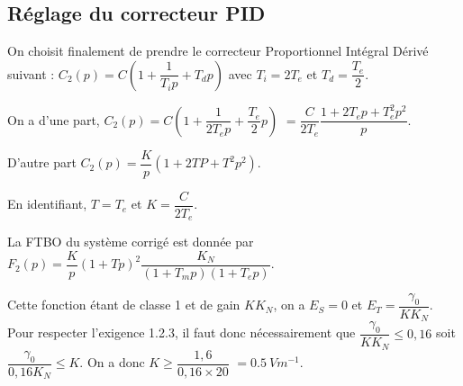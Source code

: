 \subsection{Réglage du correcteur PID}
On choisit finalement de prendre le correcteur Proportionnel Intégral Dérivé suivant :
$C_2 (p)=C \left(1+\dfrac{1}{T_i p}+T_d p\right)$ avec $T_i=2 T_e$  et $T_d=\dfrac{T_e}{2}$.

\ifprof
\begin{corrige}
On a d'une part, $C_2 (p)=C \left(1+\dfrac{1}{2 T_e p}+\dfrac{T_e}{2} p\right)$ $=\dfrac{C}{2 T_e }\dfrac{1 +2 T_e p +  T_e^2p^2}{p}$.

D'autre part $C_2 (p)=\dfrac{K}{p} \left(1+2 TP+ T^2 p^2\right)$.

En identifiant, $T=T_e$ et $K = \dfrac{C}{2 T_e }$.
\end{corrige}
\else
\fi

\ifprof
\begin{corrige}
La FTBO du système corrigé est donnée par $F_2(p)=\dfrac{K}{p} \left(1+T p\right)^2\dfrac{K_N}{\left(1+T_m p\right) \left(1+T_e p\right)}$.

Cette fonction étant de classe 1 et de gain $KK_N$, on a $E_S = 0$ et $E_T = \dfrac{\gamma_0}{KK_N}$. Pour respecter l'exigence 1.2.3, il faut donc nécessairement que $\dfrac{\gamma_0}{KK_N} \leq 0,16$ soit 
$\dfrac{\gamma_0}{0,16K_N} \leq K$. On a donc $K\geq \dfrac{1,6}{0,16\times 20}$ $=\SI{0,5}{V m^{-1}}$.
\end{corrige}
\else
\fi



